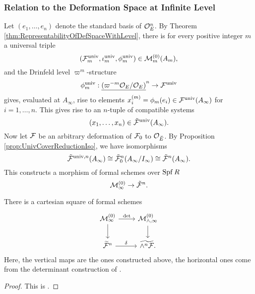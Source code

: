 \documentclass[../main.tex]{subfiles}
\begin{document}
\subsubsection{Relation to the Deformation Space at Infinite Level} %
\label{ssub:Relation to the Deformation Space at Infinite Level}
Let $(e_1, \dots, e_n)$ denote the standard basis of $\mathcal{O}_E^n$. By 
Theorem \ref{thm:RepresentabilityOfDefSpaceWithLevel}, there is for
every positive integer $m$ a universal triple 
$$(\mathcal{F}^{\mathrm{univ}}_m, \iota^{{\mathrm{univ}}}_m, \phi^{\mathrm{univ}}_m) \in \mathcal{M}_{m}^{(0)}(A_m),$$
 and the Drinfeld level
  $\varpi^m$-structure 
\begin{equation*}
  \phi_m^{\mathrm{univ}}: \underline{(\varpi^{-m}\mathcal{O}_{E}/\mathcal{O}_E)}^n \to \mathcal{F}^{\mathrm{univ}}
\end{equation*}
gives, evaluated at $A_\infty$, rise to elements $x_i^{(m)} = \phi_m(e_i) \in
\mathcal{F}^{{\mathrm{univ}}}(A_\infty)$ for $i = 1, \dots, n$. This gives rise to an $n$-tuple 
of compatible systems
\begin{equation*}
  (x_1, \dots, x_n) \in \tilde {\mathcal{F}}^{\mathrm{univ}} (A_\infty). 
\end{equation*}
Now let $\mathcal{F}$ be an arbitrary deformation of $\mathcal{F}_0$ to $\mathcal{O}_{{\breve {E}}}$. By 
Proposition \ref{prop:UnivCoverReductionIso}, we have isomorphisms
\begin{equation*}
  \tilde {\mathcal{F}}^{{\mathrm{univ}},n}(A_\infty) \cong \tilde {\mathcal{F}}_0^n(A_\infty/I_\infty)
  \cong \tilde {\mathcal{F}}^n(A_\infty).
\end{equation*}
This constructs a morphism of formal schemes over $\operatorname{Spf} R$
\begin{equation} \label{eq:MapFromMtoTildeF}
  \mathcal{M}_\infty^{(0)} \to \tilde {\mathcal{F}}^n.
\end{equation}

\begin{thm}\label{thm:WeinsteinsCartesianSquare}
  There is a cartesian square of formal schemes
  \begin{equation*}
    \begin{tikzcd}[ampersand replacement=\&]
      {\cM_\infty^{(0)}} \& {\cM_{\wedge, \infty}^{(0)}} \\
    	{\widetilde \cF^n} \& {\widetilde{\wedge^n \cF}.}
    	\arrow["\det", from=1-1, to=1-2]
    	\arrow[from=1-1, to=2-1]
    	\arrow[from=1-2, to=2-2]
    	\arrow["\delta", from=2-1, to=2-2]
    \end{tikzcd}
  \end{equation*}
  Here, the vertical maps are the ones constructed above, the horizontal ones
  come from the determinant construction of \cite{hedayatzadeh2015det}. 
\begin{proof}
  This is \cite[Theorem 2.17]{weinstein2016semistable}.
\end{proof}
\end{thm}
\end{document}
